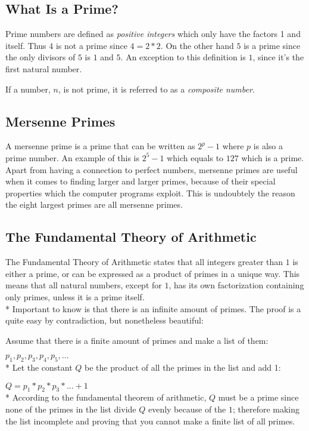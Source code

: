 \documentclass[main.tex]{subfiles}
\begin{document}
\subsection{What Is a Prime?}
Prime numbers are defined as \textit{positive integers} which only have the factors 1 and itself. Thus $4$ is not a prime since $4 = 2 * 2$. On the other hand $5$ is a prime since the only divisors of $5$ is $1$ and $5$. An exception to this definition is $1$, since it's the first natural number.

If a number, $n$, is not prime, it is referred to as a \textit{composite number}.

\subsection{Mersenne Primes}
A mersenne prime is a prime that can be written as $2^{p}-1$ where $p$ is also a prime number. An example of this is $2^5-1$ which equals to $127$ which is a prime. Apart from having a connection to perfect numbers, mersenne primes are useful when it comes to finding larger and larger primes, because of their special properties which the computer programs exploit. This is undoubtely the reason the eight largest primes are all mersenne primes. 

\subsection{The Fundamental Theory of Arithmetic}
The Fundamental Theory of Arithmetic \cite{theorem:arithmetic} states that all integers greater than $1$ is either a prime, or can be expressed as a product of primes in a unique way. This means that all natural numbers, except for $1$, has its own factorization containing only primes, unless it is a prime itself.
\newline
\\*
Important to know is that there is an infinite amount of primes. The proof is a quite easy by contradiction, but nonetheless beautiful:

\begin{mdframed}
    Assume that there is a finite amount of primes and make a list of them:

    $p_1, p_2, p_3, p_4, p_5, ...$ 
    \newline
    \\*
    Let the constant $Q$ be the product of all the primes in the list and add 1:

    $Q = p_1 * p_2 * p_3 * ... + 1$
    \newline
    \\*
    According to the fundamental theorem of arithmetic, $Q$ must be a prime since none of the primes in the list divide $Q$ evenly because of the $1$; therefore making the list incomplete and proving that you cannot make a finite list of all primes. 
\end{mdframed}
\end{document}

